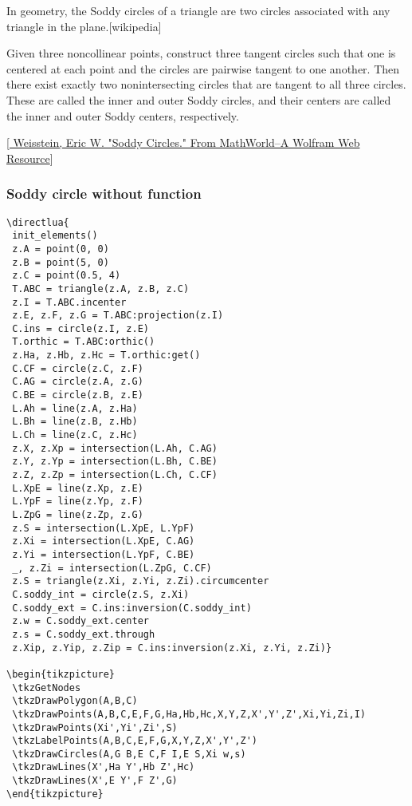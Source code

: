 In geometry, the Soddy circles of a triangle are two circles associated with any triangle in the plane.[wikipedia]

 Given three noncollinear points, construct three tangent circles such that one is centered at each point and the circles are pairwise tangent to one another. Then there exist exactly two nonintersecting circles that are tangent to all three circles. These are called the inner and outer Soddy circles, and their centers are called the inner and outer Soddy centers, respectively.

[\href{https://mathworld.wolfram.com/SoddyCircles.html}{ Weisstein, Eric W. "Soddy Circles." From MathWorld--A Wolfram Web Resource}]


\subsubsection{Soddy circle without function} %
\label{ssub:soddy}

\begin{verbatim}
\directlua{
 init_elements()
 z.A = point(0, 0)
 z.B = point(5, 0)
 z.C = point(0.5, 4)
 T.ABC = triangle(z.A, z.B, z.C)
 z.I = T.ABC.incenter
 z.E, z.F, z.G = T.ABC:projection(z.I)
 C.ins = circle(z.I, z.E)
 T.orthic = T.ABC:orthic()
 z.Ha, z.Hb, z.Hc = T.orthic:get()
 C.CF = circle(z.C, z.F)
 C.AG = circle(z.A, z.G)
 C.BE = circle(z.B, z.E)
 L.Ah = line(z.A, z.Ha)
 L.Bh = line(z.B, z.Hb)
 L.Ch = line(z.C, z.Hc)
 z.X, z.Xp = intersection(L.Ah, C.AG)
 z.Y, z.Yp = intersection(L.Bh, C.BE)
 z.Z, z.Zp = intersection(L.Ch, C.CF)
 L.XpE = line(z.Xp, z.E)
 L.YpF = line(z.Yp, z.F)
 L.ZpG = line(z.Zp, z.G)
 z.S = intersection(L.XpE, L.YpF)
 z.Xi = intersection(L.XpE, C.AG)
 z.Yi = intersection(L.YpF, C.BE)
 _, z.Zi = intersection(L.ZpG, C.CF)
 z.S = triangle(z.Xi, z.Yi, z.Zi).circumcenter
 C.soddy_int = circle(z.S, z.Xi)
 C.soddy_ext = C.ins:inversion(C.soddy_int)
 z.w = C.soddy_ext.center
 z.s = C.soddy_ext.through
 z.Xip, z.Yip, z.Zip = C.ins:inversion(z.Xi, z.Yi, z.Zi)}

\begin{tikzpicture}
 \tkzGetNodes
 \tkzDrawPolygon(A,B,C)
 \tkzDrawPoints(A,B,C,E,F,G,Ha,Hb,Hc,X,Y,Z,X',Y',Z',Xi,Yi,Zi,I)
 \tkzDrawPoints(Xi',Yi',Zi',S)
 \tkzLabelPoints(A,B,C,E,F,G,X,Y,Z,X',Y',Z')
 \tkzDrawCircles(A,G B,E C,F I,E S,Xi w,s)
 \tkzDrawLines(X',Ha Y',Hb Z',Hc)
 \tkzDrawLines(X',E Y',F Z',G)
\end{tikzpicture}
\end{verbatim}

